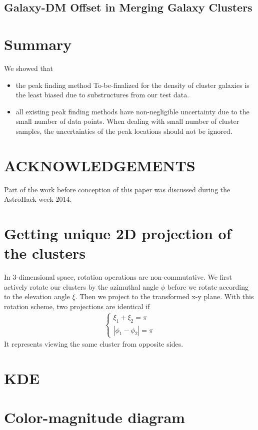 \subsection{Galaxy-DM Offset in Merging Galaxy Clusters}

\section{Summary}
We showed that 
\begin{itemize}
		\item  the peak finding method To-be-finalized for the density of cluster
			galaxies is the least biased due to substructures from our test data. 
		\item  all existing peak finding methods have non-negligible uncertainty 
			due to the small number of data points. When dealing with small number of
			cluster samples, the uncertainties of the peak locations should not be
			ignored.
\end{itemize}




\section{ACKNOWLEDGEMENTS}
Part of the work before conception of this paper was discussed during the AstroHack week
2014.

\appendix 


\section{Getting unique 2D projection of the clusters}
In 3-dimensional space, rotation operations are non-commutative.
We first actively rotate our clusters by the azimuthal angle $\phi$ before we rotate
according to the elevation angle $\xi$. Then we project to the transformed x-y
plane. With this rotation scheme, two projections are identical if 
\begin{align}
	\begin{cases}
	\xi_1 + \xi_2 = \pi \\
	|\phi_1 - \phi_2| = \pi	
	\end{cases}
\end{align}
It represents viewing the same cluster from opposite sides.



% 
\appendix


\section{KDE}
\section{Color-magnitude diagram}
